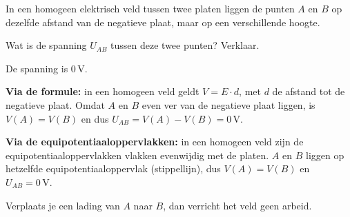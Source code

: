 \documentclass{ximera}
\begin{document}
\begin{question}
    In een homogeen elektrisch veld tussen twee platen liggen de punten $A$ en $B$ op dezelfde afstand van de negatieve plaat, maar op een verschillende hoogte.

    \begin{center}
    \end{center}

    Wat is de spanning $U_{AB}$ tussen deze twee punten? Verklaar.

    \begin{solution}\nl
        De spanning is $0 \, \mathrm{V}$.

        \textbf{Via de formule:} in een homogeen veld geldt $V = E \cdot d$, met $d$ de afstand tot de negatieve plaat. Omdat $A$ en $B$ even ver van de negatieve plaat liggen, is $V(A) = V(B)$ en dus $U_{AB} = V(A) - V(B) = 0 \, \mathrm{V}$.

        \textbf{Via de equipotentiaaloppervlakken:} in een homogeen veld zijn de equipotentiaaloppervlakken vlakken evenwijdig met de platen. $A$ en $B$ liggen op hetzelfde equipotentiaaloppervlak (stippellijn), dus $V(A) = V(B)$ en $U_{AB} = 0 \, \mathrm{V}$.
        \begin{center}
        \end{center}
        Verplaats je een lading van $A$ naar $B$, dan verricht het veld geen arbeid.
    \end{solution}
\end{question}
\end{document}
